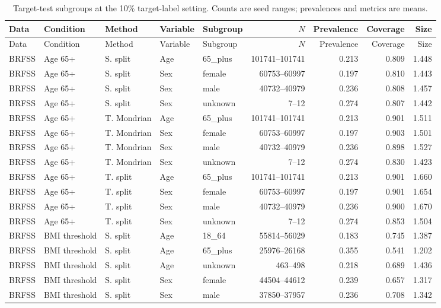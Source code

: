 \begin{longtable}{L{0.9cm}L{1.55cm}L{1.45cm}L{1.1cm}L{1.8cm}r r r r}
\caption{Target-test subgroups at the 10\% target-label setting. Counts are seed ranges; prevalences and metrics are means.}\\
\toprule Data & Condition & Method & Variable & Subgroup & $N$ & Prevalence & Coverage & Size \\ \midrule\endfirsthead
\toprule Data & Condition & Method & Variable & Subgroup & $N$ & Prevalence & Coverage & Size \\ \midrule\endhead
BRFSS & Age 65+ & S. split & Age & 65\_plus & 101741--101741 & 0.213 & 0.809 & 1.448 \\
BRFSS & Age 65+ & S. split & Sex & female & 60753--60997 & 0.197 & 0.810 & 1.443 \\
BRFSS & Age 65+ & S. split & Sex & male & 40732--40979 & 0.236 & 0.808 & 1.457 \\
BRFSS & Age 65+ & S. split & Sex & unknown & 7--12 & 0.274 & 0.807 & 1.442 \\
BRFSS & Age 65+ & T. Mondrian & Age & 65\_plus & 101741--101741 & 0.213 & 0.901 & 1.511 \\
BRFSS & Age 65+ & T. Mondrian & Sex & female & 60753--60997 & 0.197 & 0.903 & 1.501 \\
BRFSS & Age 65+ & T. Mondrian & Sex & male & 40732--40979 & 0.236 & 0.898 & 1.527 \\
BRFSS & Age 65+ & T. Mondrian & Sex & unknown & 7--12 & 0.274 & 0.830 & 1.423 \\
BRFSS & Age 65+ & T. split & Age & 65\_plus & 101741--101741 & 0.213 & 0.901 & 1.660 \\
BRFSS & Age 65+ & T. split & Sex & female & 60753--60997 & 0.197 & 0.901 & 1.654 \\
BRFSS & Age 65+ & T. split & Sex & male & 40732--40979 & 0.236 & 0.900 & 1.670 \\
BRFSS & Age 65+ & T. split & Sex & unknown & 7--12 & 0.274 & 0.853 & 1.504 \\
BRFSS & BMI threshold & S. split & Age & 18\_64 & 55814--56029 & 0.183 & 0.745 & 1.387 \\
BRFSS & BMI threshold & S. split & Age & 65\_plus & 25976--26168 & 0.355 & 0.541 & 1.202 \\
BRFSS & BMI threshold & S. split & Age & unknown & 463--498 & 0.218 & 0.689 & 1.436 \\
BRFSS & BMI threshold & S. split & Sex & female & 44504--44612 & 0.239 & 0.657 & 1.317 \\
BRFSS & BMI threshold & S. split & Sex & male & 37850--37957 & 0.236 & 0.708 & 1.342 \\

\end{longtable}
